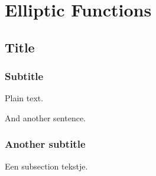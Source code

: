 \documentclass[oneside]{book}
\theoremstyle{definition}
\begin{document}
    \chapter{Elliptic Functions}
    \newpage
%    
    \newpage
    


\section{Title}

\subsection{Subtitle}

Plain text.

And another sentence.

\subsection{Another subtitle}

Een subsection tekstje.
\end{document}
